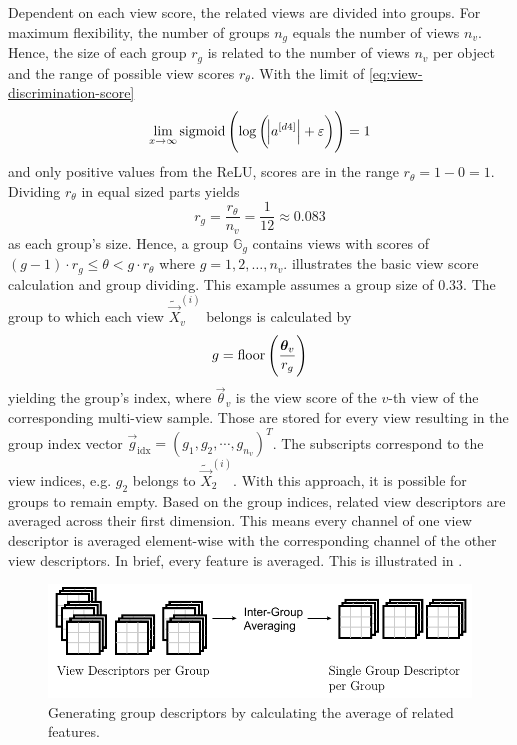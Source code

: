 Dependent on each view score, the related views are divided into groups.
For maximum flexibility, the number of groups $n_g$ equals the number of views $n_v$.
Hence, the size of each group $r_g$ is related to the number of views $n_v$ per object and the range of possible view scores $r_\theta$.
With the limit of \eqref{eq:view-discrimination-score}
\begin{equation}
	\lim_{x\rightarrow \infty} \operatorname{sigmoid}\left( \log \left( \abs{a^{[d4]}} + \varepsilon \right) \right) = 1
\end{equation}
and only positive values from the ReLU, scores are in the range $r_\theta = 1 - 0 = 1$.
Dividing $r_\theta$ in equal sized parts yields
\begin{equation}
	r_g = \frac{r_\theta}{n_v} = \frac{1}{12} \approx 0.083
\end{equation}
as each group's size.
Hence, a group $\mathbb{G}_g$ contains views with scores of $(g-1) \cdot r_g \leq \theta < g \cdot r_\theta$ where $g = {1,2, \dots, n_v}$.
 illustrates the basic view score calculation and group dividing.
This example assumes a group size of $0.33$.
The group to which each view $\tilde{\vec{X}}^{(i)}_v$ belongs is calculated by
\begin{equation}
	g = \operatorname{floor} \left( \frac{\bm{\theta}_v}{r_g} \right)
\end{equation}
yielding the group's index, where $\vec{\theta}_v$ is the view score of the $v$-th view of the corresponding multi-view sample.
Those are stored for every view resulting in the group index vector $\vec{g}_{\text{idx}} = \left( g_1, g_2, \cdots, g_{n_v}\right)^T$.
The subscripts correspond to the view indices, e.g. $g_2$ belongs to $\tilde{\vec{X}}^{(i)}_2$.
With this approach, it is possible for groups to remain empty.
Based on the group indices, related view descriptors are averaged across their first dimension.
This means every channel of one view descriptor is averaged element-wise with the corresponding channel of the other view descriptors.
In brief, every feature is averaged.
This is illustrated in .
\begin{figure}
	\centering
	\includegraphics[]{images/grouping_module_group_descriptors.pdf}
	\caption[Generating group descriptors]{Generating group descriptors by calculating the average of related features.}
	\label{fig:grouping-module-group-descriptors}
\end{figure}
